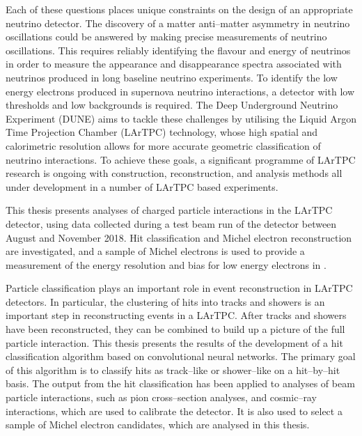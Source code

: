 Each of these questions places unique constraints on the design of an
appropriate neutrino detector. The discovery of a matter anti--matter asymmetry
in neutrino oscillations could be answered by making precise measurements of
neutrino oscillations. This requires reliably identifying the flavour and energy
of neutrinos in order to measure the appearance and disappearance spectra
associated with neutrinos produced in long baseline neutrino experiments. To
identify the low energy electrons produced in supernova neutrino interactions, a
detector with low thresholds and low backgrounds is required. The Deep
Underground Neutrino Experiment (DUNE) aims to tackle these challenges by
utilising the Liquid Argon Time Projection Chamber (LArTPC) technology, whose
high spatial and calorimetric resolution allows for more accurate geometric
classification of neutrino interactions. To achieve these goals, a significant 
programme of LArTPC research is ongoing with construction, reconstruction, and 
analysis methods all under development in a number of LArTPC based 
experiments\cite{Acciarri:2016smi, Cavanna:2014iqa, Antonello:2015lea, 
Abi:2017aow}. 

This thesis presents analyses of charged particle interactions in the
\protodune{} LArTPC detector, using data collected during a test beam run of the
detector between August and November 2018. Hit classification and Michel 
electron reconstruction are investigated, and a sample of Michel electrons is 
used to provide a measurement of the energy resolution and bias for low energy 
electrons in \protodune{}.

Particle classification plays an important role in event reconstruction in 
LArTPC detectors. In particular, the clustering of hits into tracks and 
showers is an important step in reconstructing events in a LArTPC. After tracks
and showers have been reconstructed, they can be combined to build up a picture
of the full particle interaction. This thesis presents the results of the 
development of a hit classification algorithm based on convolutional neural
networks. The primary goal of this algorithm is to classify hits as 
track--like or shower--like on a hit--by--hit basis. The output from the hit 
classification has been applied to analyses of beam particle interactions, 
such as pion cross--section analyses, and cosmic--ray interactions, which 
are used to calibrate the \protodune{} detector. It is also used to select a 
sample of Michel electron candidates, which are analysed in this thesis.

